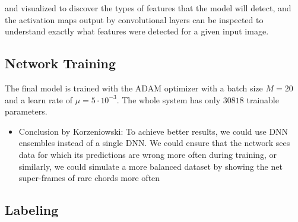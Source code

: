 \documentclass{scrartcl}
\begin{document}
and visualized to discover the types of features that the model will detect, and the activation maps output by convolutional layers can be inspected to understand exactly what features were detected for a given input image.



\newpage

\subsection{Network Training}
The final model is trained with the ADAM optimizer \cite{Kingma2014} with a batch size $M = 20$ and a learn rate of $\mu = 5 \cdot10^{-3}$. The whole system has only $30818$ trainable parameters. 

\begin{itemize}
\item Conclusion by Korzeniowski: To achieve better results, we could use DNN ensembles instead of a single DNN. We could ensure that the network sees data for which its predictions are wrong more often during training, or similarly, we could simulate a more balanced dataset by showing the net super-frames of rare chords more often \cite{Korzeniowski2016}
\end{itemize}


\subsection{Labeling}
\end{document}
